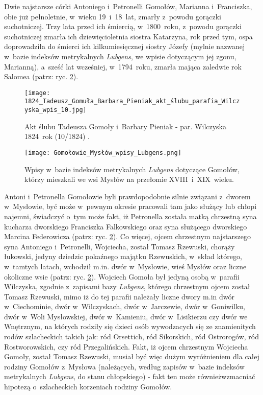 Dwie najstarsze córki Antoniego i~Petronelli Gomołów, Marianna i~Franciszka, 
obie już pełnoletnie, w~wieku 19~i~18~lat, zmarły z~powodu gorączki 
suchotniczej. Trzy lata przed ich śmiercią, w~1800~roku, z~powodu gorączki 
suchotniczej zmarła ich dziewięcioletnia siostra Katarzyna, rok przed tym, 
ospa doprowadziła do śmierci ich kilkumiesięcznej siostry Józefy (mylnie 
nazwanej w~bazie indeksów metrykalnych \emph{Lubgens}, we wpisie dotyczącym 
jej zgonu, Marianną), a~sześć lat wcześniej, w~1794~roku, zmarła mająca 
zaledwie rok Salomea (patrz: ryc. \ref{fig:gomola3_lubgens}).

\begin{figure}[!ht]
    \vspace*{0.5cm}
    \centering \texttt{[image: 
        1824\_Tadeusz\_Gomuła\_Barbara\_Pieniak\_akt\_ślubu\_parafia\_Wilczyska\_wpis\_10.jpg]}
    \captionsetup{format=hang}
    \caption{Akt ślubu Tadeusza Gomoły i~Barbary Pieniak - par. Wilczyska 
    1824~rok (10/1824) \cite{par_wilczyska1}.}
    \label{fig:tbgomola_slub}
\end{figure}

\begin{figure}[!ht]
    \vspace*{0.5cm}
    \centering \texttt{[image: 
        Gomołowie\_Mysłów\_wpisy\_Lubgens.png]}
    \captionsetup{format=hang}
    \caption{Wpisy w~bazie indeksów metrykalnych \emph{Lubgens} dotyczące 
    Gomołów, którzy mieszkali we wsi Mysłów na przełomie XVIII~i~XIX~wieku.}
    \label{fig:gomola3_lubgens}
\end{figure}

Antoni i~Petronella Gomołowie byli prawdopodobnie silnie związani z~dworem 
w~Mysłowie, być może w~pewnym okresie pracowali tam jako służący lub chłopi 
najemni, świadczyć o~tym może fakt, iż Petronella została matką chrzestną 
syna kucharza dworskiego Franciszka Falkowskiego oraz syna służącego 
dworskiego Marcina Federowicza (patrz: ryc. \ref{fig:gomola3_lubgens}). Co 
więcej, ojcem chrzestnym najstarszego syna Antoniego i~Petronelli, Wojciecha, 
został Tomasz Rzewuski, chorąży łukowski, jedyny dziedzic pokaźnego majątku 
Rzewuskich, w~skład którego, w~tamtych latach, wchodził m.in. dwór 
w~Mysłowie, wieś Mysłów oraz liczne okoliczne wsie (patrz: ryc. 
\ref{fig:gomola3_lubgens}). Wojciech Gomoła był jedyną osobą w~parafii 
Wilczyska, zgodnie z~zapisami bazy \emph{Lubgens}, którego chrzestnym ojcem 
został Tomasz Rzewuski, mimo iż do tej parafii należały liczne dwory m.in 
dwór w~Ciechominie, dwór w~Wilczyskach, dwór w~Jarczewie, dwór w~Goniwilku, 
dwór w~Woli Mysłowskiej, dwór w~Kamieniu, dwór w~Lisikierzu czy dwór we 
Wnętrznym, na których rodziły się dzieci osób wywodzacych się ze znamienitych 
rodów szlacheckich takich jak: ród Orsettich, ród Sikorskich, ród Ostrorogów, 
ród Rostworowskich, czy ród Przegalińskich. Fakt, iż ojcem chrzestnym 
Wojciecha Gomoły, został Tomasz Rzewuski, musiał być więc dużym wyróżnieniem 
dla całej rodziny Gomołów z~Mysłowa (należących, według zapisów w~bazie 
indeksów metrykalnych \emph{Lubgens}, do stanu chłopskiego) - fakt ten może 
równieżwzmacniać hipotezą o~szlacheckich korzeniach rodziny Gomołów. 

